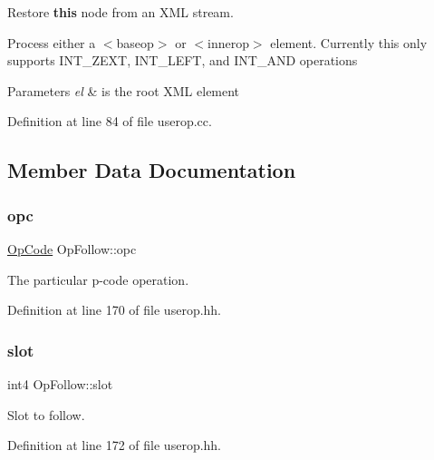 Restore {\bfseries{this}} node from an X\+ML stream. 

Process either a $<$baseop$>$ or $<$innerop$>$ element. Currently this only supports I\+N\+T\+\_\+\+Z\+E\+XT, I\+N\+T\+\_\+\+L\+E\+FT, and I\+N\+T\+\_\+\+A\+ND operations 
\begin{DoxyParams}{Parameters}
{\em el} & is the root X\+ML element \\
\hline
\end{DoxyParams}


Definition at line 84 of file userop.\+cc.



\subsection{Member Data Documentation}
\mbox{\label{struct_op_follow_a9b8a62fc43b7a806b8cc339d68422749}} 
\subsubsection{\texorpdfstring{opc}{opc}}
{\footnotesize\ttfamily \mbox{\hyperlink{opcodes_8hh_abeb7dfb0e9e2b3114e240a405d046ea7}{Op\+Code}} Op\+Follow\+::opc}



The particular p-\/code operation. 



Definition at line 170 of file userop.\+hh.

\mbox{\label{struct_op_follow_a6a4f47ec389b5c9ef9ee6ecfa259fdb8}} 
\subsubsection{\texorpdfstring{slot}{slot}}
{\footnotesize\ttfamily int4 Op\+Follow\+::slot}



Slot to follow. 



Definition at line 172 of file userop.\+hh.

\mbox{\label{struct_op_follow_a1a70586a4329aae03bf49b7e129eed8c}} 
